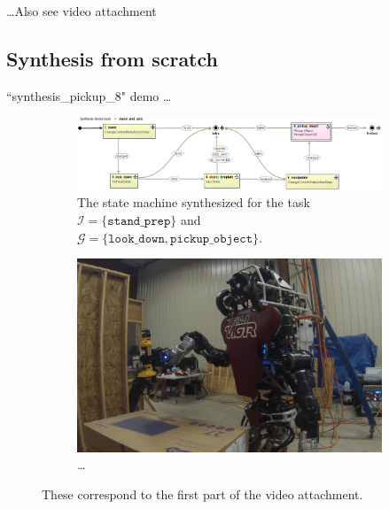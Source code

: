 
\ldots Also see video attachment


\subsection{Synthesis from scratch}

``synthesis\_pickup\_8" demo \ldots

\begin{figure}[t]
	\centering
	\begin{subfigure}[b]{0.99\columnwidth}
	\includegraphics[width=0.99\columnwidth,clip]{./img/stand_and_pick_sm.png}
	\caption{The state machine synthesized for the task $\mathcal{I} = \{ \mathtt{stand\_prep} \}$ and $\mathcal{G} = \{ \mathtt{look\_down}, \mathtt{pickup\_object} \}$.
	}
	\label{Fig:stand_and_pick_sm}
	\end{subfigure}
	
	\vspace{4 pt}
	\begin{subfigure}[b]{0.95\columnwidth}
	\includegraphics[width=0.99\columnwidth, clip]{./img/stand_and_pick_gopro.png}
	\caption{\ldots
	} 
	\label{Fig:runtime2}
	\end{subfigure}
	\caption{These correspond to the first part of the video attachment.
	}
	\label{Fig:stand_and_pick_demo}
\end{figure}


